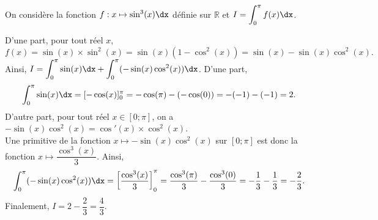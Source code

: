 \documentclass[11pt,fleqn, openany]{book} %
\begin{document}
\begin{example}On considère la fonction $f:x\mapsto \sin^3(x)\dx$ définie sur $\mathbb{R}$ et $I=\displaystyle\int_0^{\pi} f(x)\dx$.

D'une part, pour tout réel $x$,
\[f(x)=\sin(x) \times \sin^2(x) = \sin(x)(1-\cos^2(x))=\sin(x)-\sin(x)\cos^2(x).\]
Ainsi, $I = \displaystyle\int_0^{\pi}\sin(x)\dx+\displaystyle\int_0^{\pi}(-\sin(x)\cos^2(x))\dx$. D'une part, 
\[\displaystyle\int_0^{\pi}\sin(x)\dx = [-\cos(x)]_0^{\pi}=-\cos(\pi)-(-\cos(0))=-(-1)-(-1)=2.\]
D'autre part, pour tout réel $x\in[0;\pi]$, on a $-\sin(x)\cos^2(x)=\cos'(x) \times \cos^2(x)$. \\Une primitive de la fonction $x\mapsto -\sin(x)\cos^2(x)$ sur $[0;\pi]$ est donc la fonction $x\mapsto \dfrac{\cos^3(x)}{3}$. Ainsi,
\[\displaystyle\int_0^{\pi}(-\sin(x)\cos^2(x))\dx=\left[\dfrac{\cos^3(x)}{3}\right]_{0}^{\pi}=\dfrac{\cos^3(\pi)}{3}-\dfrac{\cos^3(0)}{3}=-\dfrac{1}{3}-\dfrac{1}{3}=-\dfrac{2}{3}.\]
Finalement, $I=2-\dfrac{2}{3}=\dfrac{4}{3}$.\end{example}
\end{document}
